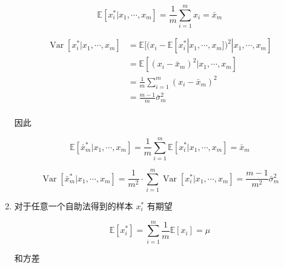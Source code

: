 \documentclass[answers]{exam}  %
\begin{document}
\begin{questions}
\begin{solution}
\begin{enumerate}
            \begin{equation}
              \mathbb{E}[x_i^{*} | x_1, \cdots, x_m] = \frac{1}{m}\sum_{i=1}^{m} x_i = \bar{x}_m
            \end{equation}

            \begin{equation}
              \begin{aligned}
                \operatorname{Var}[x_i^{*} | x_1, \cdots, x_m] & = \mathbb{E}[(x_i - \mathbb{E}[x_i^{*} | x_1, \cdots, x_m])^{2} | x_1, \cdots, x_m] \\
                                                               & = \mathbb{E}[(x_i - \bar{x}_m)^{2} | x_1, \cdots, x_m]                              \\
                                                               & = \frac{1}{m}\sum_{i=1}^{m} (x_i - \bar{x}_m)^{2}                                   \\
                                                               & = \frac{m-1}{m}\bar{\sigma}_m^{2}                                                   \\
              \end{aligned}
            \end{equation}

            因此

            \begin{equation}
              \mathbb{E}[\bar{x}_m^{*} | x_1, \cdots, x_m] = \frac{1}{m}\sum_{i=1}^{m} \mathbb{E}[x_i^{*} | x_1, \cdots, x_m] = \bar{x}_m
            \end{equation}

            \begin{equation}
              \operatorname{Var}[\bar{x}_m^{*} | x_1, \cdots, x_m] = \frac{1}{m^{2}} \cdot \sum_{i=1}^{m} \operatorname{Var}[x_i^{*} | x_1, \cdots, x_m] = \frac{m-1}{m^{2}}\bar{\sigma}_m^{2}
            \end{equation}

      \item 对于任意一个自助法得到的样本 $x_i^{*}$ 有期望

            \begin{equation}
              \mathbb{E}[x_i^{*}] = \sum_{i=1}^{m} \frac{1}{m}\mathbb{E}[x_i] = \mu
            \end{equation}

            和方差


\end{enumerate}
\end{solution}
\end{questions}
\end{document}
